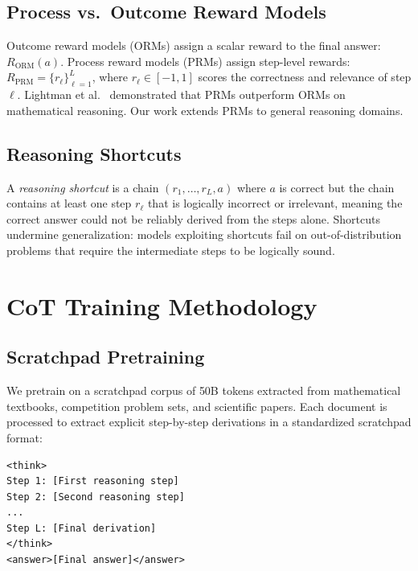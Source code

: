 \documentclass[11pt,a4paper]{article}
\begin{document}
\subsection{Process vs.\ Outcome Reward Models}

Outcome reward models (ORMs) assign a scalar reward to the final answer: $R_{\text{ORM}}(a)$.
Process reward models (PRMs) assign step-level rewards: $R_{\text{PRM}} = \{r_\ell\}_{\ell=1}^L$,
where $r_\ell \in [-1, 1]$ scores the correctness and relevance of step $\ell$.
Lightman et al.~\cite{lightman2023lets} demonstrated that PRMs outperform ORMs on
mathematical reasoning. Our work extends PRMs to general reasoning domains.

\subsection{Reasoning Shortcuts}

A \emph{reasoning shortcut} is a chain $(r_1, \ldots, r_L, a)$ where $a$ is correct
but the chain contains at least one step $r_\ell$ that is logically incorrect or
irrelevant, meaning the correct answer could not be reliably derived from the steps
alone. Shortcuts undermine generalization: models exploiting shortcuts fail on
out-of-distribution problems that require the intermediate steps to be logically sound.

\section{CoT Training Methodology}
\label{sec:methodology}

\subsection{Scratchpad Pretraining}

We pretrain on a scratchpad corpus of 50B tokens extracted from mathematical textbooks,
competition problem sets, and scientific papers. Each document is processed to extract
explicit step-by-step derivations in a standardized scratchpad format:

\begin{verbatim}
<think>
Step 1: [First reasoning step]
Step 2: [Second reasoning step]
...
Step L: [Final derivation]
</think>
<answer>[Final answer]</answer>
\end{verbatim}
\end{document}
